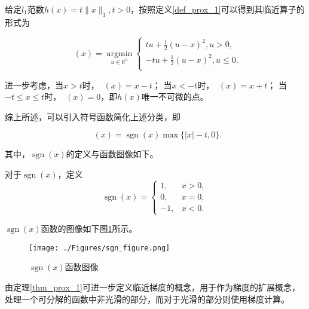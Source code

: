 \begin{solution}
    给定$l_{1}$范数$h(x)=t\|x\|_{1}, t>0$，按照定义\ref{def_prox_1}可以得到其临近算子的形式为

    \begin{equation}
        \mathop{\mathrm{prox_{h}}}(x) = \mathop{\mathrm{argmin}}\limits_{u\in \mathbb{R}^{n}}
        \begin{cases}
            tu + \frac{1}{2}(u-x)^{2}, u>0      ,\\
            -tu + \frac{1}{2}(u-x)^{2}, u\leq 0 .\\
        \end{cases}
    \end{equation}

    进一步考虑，当$x>t$时，$\mathop{\mathrm{prox_{h}}}(x) = x-t$；
    当$x<-t$时，$\mathop{\mathrm{prox_{h}}}(x) = x+t$；
    当$-t\leq x\leq t$时，$\mathop{\mathrm{prox_{h}}}(x) = 0$，即$h(x)$唯一不可微的点。

    综上所述，可以引入符号函数简化上述分类，即
    
    \begin{equation}\label{eq_prox_3}
        \mathop{\mathrm{prox_{h}}}(x) = \mathop{\mathrm{sgn}}(x)\max\{|x|-t, 0\}.
    \end{equation}
    
    其中，$\mathop{\mathrm{sgn}}(x)$的定义与函数图像如下。
    \begin{definition}
        对于$\mathop{\mathrm{sgn}}(x)$，定义
        \begin{equation}
            \mathop{\mathrm{sgn}}(x) = 
            \begin{cases}
                1, &x > 0, \\
                0, &x = 0, \\
                -1, &x < 0.
            \end{cases}
        \end{equation}
    \end{definition}

    $\mathop{\mathrm{sgn}}(x)$函数的图像如下图\ref{figure_sgn}所示。
    \begin{figure}[hbtp]
        \centering
        \texttt{[image: ./Figures/sgn\_figure.png]}
        \caption{$\mathop{\mathrm{sgn}}(x)$函数图像}
        \label{figure_sgn}
    \end{figure}
\end{solution}

由定理\ref{thm_prox_1}可进一步定义临近梯度的概念，用于作为梯度的扩展概念，处理一个可分解的函数中非光滑的部分，而对于光滑的部分则使用梯度计算。

